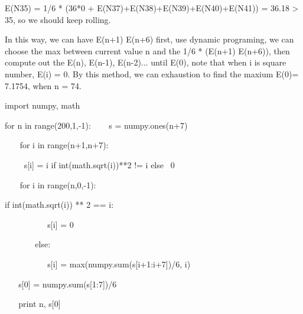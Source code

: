 \documentclass[10pt]{article}
\begin{document}
\qquad E(N35) = 1/6 * (36*0 + E(N37)+E(N38)+E(N39)+E(N40)+E(N41)) = 36.18 > 35, so we should keep rolling.

\qquad In this way, we can have E(n+1)  E(n+6) first, use dynamic programing, we can choose the max between current value n and the 1/6 * (E(n+1)  E(n+6)), \qquad \qquad then compute out the E(n), E(n-1), E(n-2)... until E(0), note that when i is square number, E(i) = 0. By this method, we can exhaustion to find the maxium \qquad \qquad E(0)= 7.1754, when n = 74.

import numpy, math

for n in range(200,1,-1):
~~~ s = numpy.ones(n+7)

~~~ for i in range(n+1,n+7):

~~~~ s[i] = i if int(math.sqrt(i))**2 != i else~ 0

~~~ for i in range(n,0,-1):

\qquad if int(math.sqrt(i)) ** 2 == i:

~~ ~~~~~~~ s[i] = 0

~~ ~~~~ else:

~ ~~~~~~~~ s[i] = max(numpy.sum(s[i+1:i+7])/6, i)

~ ~ s[0] = numpy.sum(s[1:7])/6

~ ~ print n, s[0]
\end{document}
